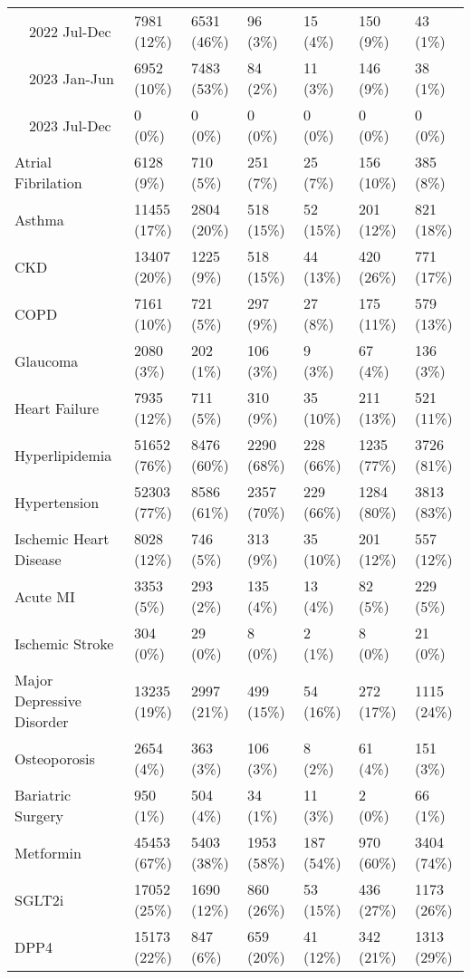 \begin{longtable}{p{}p{}p{}p{}p{}p{}p{}}
    2022 Jul-Dec & 7981 (12\%) & 6531 (46\%) & 96 (3\%) & 15 (4\%) & 150 (9\%) & 43 (1\%) \\ 
    2023 Jan-Jun & 6952 (10\%) & 7483 (53\%) & 84 (2\%) & 11 (3\%) & 146 (9\%) & 38 (1\%) \\ 
    2023 Jul-Dec & 0 (0\%) & 0 (0\%) & 0 (0\%) & 0 (0\%) & 0 (0\%) & 0 (0\%) \\ 
  Atrial Fibrilation & 6128 (9\%) & 710 (5\%) & 251 (7\%) & 25 (7\%) & 156 (10\%) & 385 (8\%) \\ 
  Asthma & 11455 (17\%) & 2804 (20\%) & 518 (15\%) & 52 (15\%) & 201 (12\%) & 821 (18\%) \\ 
  CKD & 13407 (20\%) & 1225 (9\%) & 518 (15\%) & 44 (13\%) & 420 (26\%) & 771 (17\%) \\ 
  COPD & 7161 (10\%) & 721 (5\%) & 297 (9\%) & 27 (8\%) & 175 (11\%) & 579 (13\%) \\ 
  Glaucoma & 2080 (3\%) & 202 (1\%) & 106 (3\%) & 9 (3\%) & 67 (4\%) & 136 (3\%) \\ 
  Heart Failure & 7935 (12\%) & 711 (5\%) & 310 (9\%) & 35 (10\%) & 211 (13\%) & 521 (11\%) \\ 
  Hyperlipidemia & 51652 (76\%) & 8476 (60\%) & 2290 (68\%) & 228 (66\%) & 1235 (77\%) & 3726 (81\%) \\ 
  Hypertension & 52303 (77\%) & 8586 (61\%) & 2357 (70\%) & 229 (66\%) & 1284 (80\%) & 3813 (83\%) \\ 
  Ischemic Heart Disease & 8028 (12\%) & 746 (5\%) & 313 (9\%) & 35 (10\%) & 201 (12\%) & 557 (12\%) \\ 
  Acute MI & 3353 (5\%) & 293 (2\%) & 135 (4\%) & 13 (4\%) & 82 (5\%) & 229 (5\%) \\ 
  Ischemic Stroke & 304 (0\%) & 29 (0\%) & 8 (0\%) & 2 (1\%) & 8 (0\%) & 21 (0\%) \\ 
  Major Depressive Disorder & 13235 (19\%) & 2997 (21\%) & 499 (15\%) & 54 (16\%) & 272 (17\%) & 1115 (24\%) \\ 
  Osteoporosis & 2654 (4\%) & 363 (3\%) & 106 (3\%) & 8 (2\%) & 61 (4\%) & 151 (3\%) \\ 
  Bariatric Surgery & 950 (1\%) & 504 (4\%) & 34 (1\%) & 11 (3\%) & 2 (0\%) & 66 (1\%) \\ 
  Metformin & 45453 (67\%) & 5403 (38\%) & 1953 (58\%) & 187 (54\%) & 970 (60\%) & 3404 (74\%) \\ 
  SGLT2i & 17052 (25\%) & 1690 (12\%) & 860 (26\%) & 53 (15\%) & 436 (27\%) & 1173 (26\%) \\ 
  DPP4 & 15173 (22\%) & 847 (6\%) & 659 (20\%) & 41 (12\%) & 342 (21\%) & 1313 (29\%) \\ 

\end{longtable}
